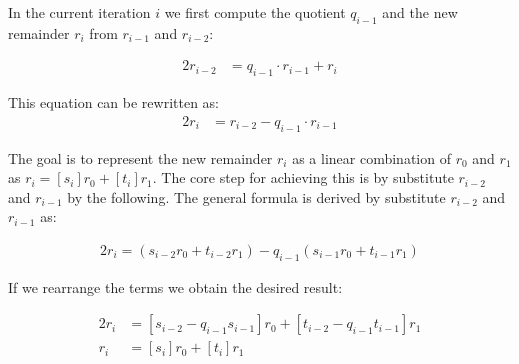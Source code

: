 \noindent
In the current iteration $i$ we first compute the quotient $q_{i-1}$ and the new remainder $r_i$ from $r_{i-1}$ and $r_{i-2}$:

\noindent
\begin{alignat*}{2}
r_{i-2} &= q_{i-1} \cdot r_{i-1}+r_i 
\end{alignat*}

\noindent
This equation can be rewritten as:\\

\noindent
\begin{alignat*}{2}
r_i &= r_{i-2}-q_{i-1} \cdot r_{i-1} 
\end{alignat*}


\noindent
The goal is to represent the new remainder $r_i$ as a linear combination of $r_0$ and $r_1$ as $r_i = [s_i]r_0 +[t_i]r_1$. The core step for achieving this is by substitute $r_{i-2}$ and $r_{i-1}$ by the following. The general formula is derived by substitute $r_{i-2}$ and $r_{i-1}$ as:


\noindent
\begin{alignat*}{2}
r_i = (s_{i-2}r_0+t_{i-2}r_1)-q_{i-1}(s_{i-1}r_0+t_{i-1}r_1) 
\end{alignat*}


\noindent
If we rearrange the terms we obtain the desired result:

\noindent
\begin{alignat*}{2}
r_i &= [s_{i-2}-q_{i-1}s_{i-1}]r_0 +[t_{i-2}-q_{i-1}t_{i-1}]r_1\\
r_i &= [s_i]r_0 +[t_i]r_1
\end{alignat*}